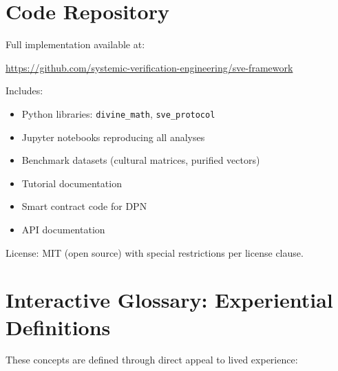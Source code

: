 \documentclass[11pt,a4paper]{article}
\theoremstyle{definition}
\theoremstyle{remark}
\begin{document}
\section{Code Repository}

Full implementation available at:

\begin{center}
\url{https://github.com/systemic-verification-engineering/sve-framework}
\end{center}

Includes:
\begin{itemize}
\item Python libraries: \texttt{divine\_math}, \texttt{sve\_protocol}
\item Jupyter notebooks reproducing all analyses
\item Benchmark datasets (cultural matrices, purified vectors)
\item Tutorial documentation
\item Smart contract code for DPN
\item API documentation
\end{itemize}

License: MIT (open source) with special restrictions per license clause.

\section{Interactive Glossary: Experiential Definitions}

These concepts are defined through direct appeal to lived experience:
\end{document}
